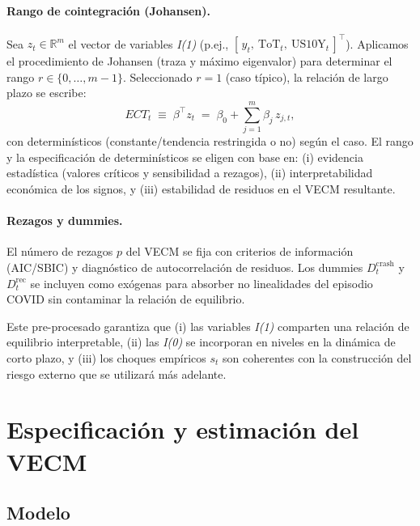 \documentclass[11pt,a4paper]{article}
\newcommand{\R}{\mathbb{R}}
\newcommand{\1}{\mathbf{1}}
\begin{document}
\paragraph{Rango de cointegración (Johansen).}
Sea $z_t \in \R^{m}$ el vector de variables \emph{I(1)} (p.ej., $[\,y_t,\ \text{ToT}_t,\ \text{US10Y}_t\,]^\top$). 
Aplicamos el procedimiento de Johansen (traza y máximo eigenvalor) para determinar el rango $r \in \{0,\ldots,m-1\}$. 
Seleccionado $r=1$ (caso típico), la relación de largo plazo se escribe:
\[
ECT_t \;\equiv\; \beta^\top z_t \;=\; \beta_0 + \sum_{j=1}^{m} \beta_j\, z_{j,t},
\]
con determinísticos (constante/tendencia restringida o no) según el caso. 
El rango y la especificación de determinísticos se eligen con base en:
(i) evidencia estadística (valores críticos y sensibilidad a rezagos),
(ii) interpretabilidad económica de los signos, y
(iii) estabilidad de residuos en el VECM resultante.

\paragraph{Rezagos y dummies.}
El número de rezagos $p$ del VECM se fija con criterios de información (AIC/SBIC) y diagnóstico de autocorrelación de residuos. 
Los dummies $D^{\text{crash}}_t$ y $D^{\text{rec}}_t$ se incluyen como exógenas para absorber no linealidades del episodio COVID sin contaminar la relación de equilibrio.

\medskip
Este pre-procesado garantiza que (i) las variables \emph{I(1)} comparten una relación de equilibrio interpretable, (ii) las \emph{I(0)} se incorporan en niveles en la dinámica de corto plazo, y (iii) los choques empíricos $s_t$ son coherentes con la construcción del riesgo externo que se utilizará más adelante.

\section{Especificación y estimación del VECM}

\subsection{Modelo}
\end{document}
